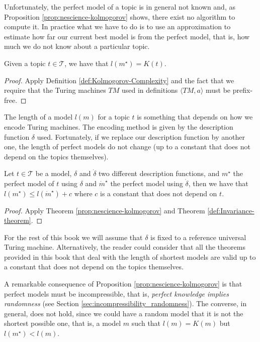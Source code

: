 Unfortunately, the perfect model of a topic is in general not known and, as Proposition \ref{prop:nescience-kolmogorov} shows, there exist no algorithm to compute it. In practice what we have to do is to use an approximation to estimate how far our current best model is from the perfect model, that is, how much we do not know about a particular topic.

\begin{proposition}
\label{prop:nescience-kolmogorov}
Given a topic $t \in \mathcal{T}$, we have that $l \left(m^{\star} \right) = K\left( t \right)$.
\end{proposition}
\begin{proof}
Apply Definition \ref{def:Kolmogorov-Complexity} and the fact that we require that the Turing machines $TM$ used in definitions $\langle TM,a\rangle$ must be prefix-free.
\end{proof}

The length of a model $l \left( m \right)$ for a topic $t$ is something that depends on how we encode Turing machines. The encoding method is given by the description function $\delta$ used. Fortunately, if we replace our description function by another one, the length of perfect models do not change (up to a constant that does not depend on the topics themselves).

\begin{corollary}
Let $t \in \mathcal{T}$ be a model, $\delta$ and $\dot{\delta}$ two different description functions, and $m^{\star}$ the perfect model of $t$ using $\delta$ and $\dot{m}^{\star}$ the perfect model using $\dot{\delta}$, then we have that $l \left( m^{\star} \right) \leq l \left( \dot{m}^{\star} \right) + c$ where $c$ is a constant that does not depend on $t$.
\end{corollary}
\begin{proof}
Apply Theorem \ref{prop:nescience-kolmogorov} and Theorem \ref{def:Invariance-theorem}.
\end{proof}

For the rest of this book we will assume that $\delta$ is fixed to a reference universal Turing machine. Alternatively, the reader could consider that all the theorems provided in this book that deal with the length of shortest models are valid up to a constant that does not depend on the topics themselves.

A remarkable consequence of Proposition \ref{prop:nescience-kolmogorov} is that perfect models must be incompressible, that is, \emph{perfect knowledge implies randomness} (see Section \ref{sec:incompressibility_randomness}). The converse, in general, does not hold, since we could have a random model that it is not the shortest possible one, that is, a model $m$ such that $l(m) = K(m)$ but $l(m^{\star}) < l(m)$.

